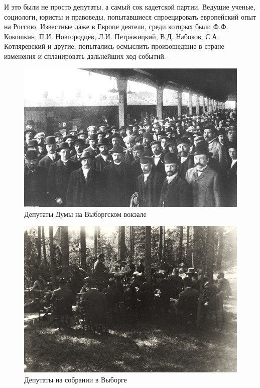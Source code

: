 И это были не просто депутаты, а самый сок кадетской партии. Ведущие ученые, социологи, юристы и правоведы, попытавшиеся спроецировать европейский опыт на Россию. Известные даже в Европе деятели, среди которых были Ф.Ф. Кокошкин, П.И. Новгородцев, Л.И. Петражицкий, В.Д. Набоков, С.А. Котляревский и другие, попытались осмыслить произошедшие в стране изменения и спланировать дальнейших ход событий.

\begin{figure}[h!tb] 
	\centering\includegraphics[scale=0.5]{Vozzvanie/C0fHlMQuvgM.jpg}
	\caption{Депутаты Думы на Выборгском вокзале	}%
\end{figure}

\begin{figure}[h!tb] 
	\centering\includegraphics[scale=0.5]{Vozzvanie/heA6WdNPX0w.jpg}
	\caption{Депутаты на собрании в Выборге	}%
\end{figure}


